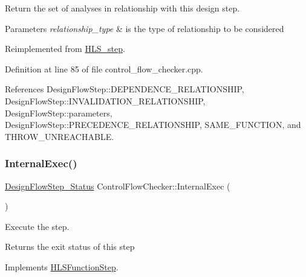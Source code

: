 Return the set of analyses in relationship with this design step. 


\begin{DoxyParams}{Parameters}
{\em relationship\+\_\+type} & is the type of relationship to be considered \\
\hline
\end{DoxyParams}


Reimplemented from \hyperlink{classHLS__step_aed0ce8cca9a1ef18e705fc1032ad4de5}{H\+L\+S\+\_\+step}.



Definition at line 85 of file control\+\_\+flow\+\_\+checker.\+cpp.



References Design\+Flow\+Step\+::\+D\+E\+P\+E\+N\+D\+E\+N\+C\+E\+\_\+\+R\+E\+L\+A\+T\+I\+O\+N\+S\+H\+IP, Design\+Flow\+Step\+::\+I\+N\+V\+A\+L\+I\+D\+A\+T\+I\+O\+N\+\_\+\+R\+E\+L\+A\+T\+I\+O\+N\+S\+H\+IP, Design\+Flow\+Step\+::parameters, Design\+Flow\+Step\+::\+P\+R\+E\+C\+E\+D\+E\+N\+C\+E\+\_\+\+R\+E\+L\+A\+T\+I\+O\+N\+S\+H\+IP, S\+A\+M\+E\+\_\+\+F\+U\+N\+C\+T\+I\+ON, and T\+H\+R\+O\+W\+\_\+\+U\+N\+R\+E\+A\+C\+H\+A\+B\+LE.

\mbox{\label{classControlFlowChecker_ac563bc1d94b92827854435787625d8a5}} 
\subsubsection{\texorpdfstring{Internal\+Exec()}{InternalExec()}}
{\footnotesize\ttfamily \hyperlink{design__flow__step_8hpp_afb1f0d73069c26076b8d31dbc8ebecdf}{Design\+Flow\+Step\+\_\+\+Status} Control\+Flow\+Checker\+::\+Internal\+Exec (\begin{DoxyParamCaption}{ }\end{DoxyParamCaption})\hspace{0.3cm}{\ttfamily [virtual]}}



Execute the step. 

\begin{DoxyReturn}{Returns}
the exit status of this step 
\end{DoxyReturn}


Implements \hyperlink{classHLSFunctionStep_a8db4c00d080655984d98143206fc9fa8}{H\+L\+S\+Function\+Step}.



